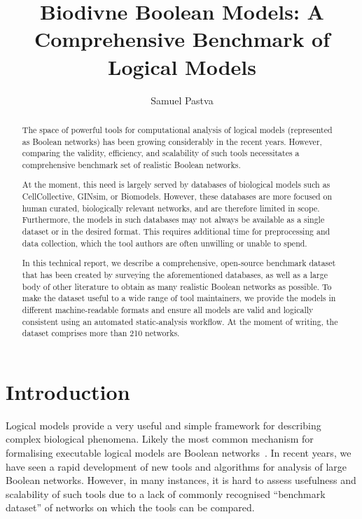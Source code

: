 \documentclass{article}
\title{Biodivne Boolean Models: A Comprehensive Benchmark of Logical Models}
\author{Samuel Pastva}
\date{}
\begin{document}
\maketitle

\begin{abstract}
	The space of powerful tools for computational analysis of logical models (represented as Boolean networks) has been growing considerably in the recent years. However, comparing the validity, efficiency, and scalability of such tools necessitates a comprehensive benchmark set of realistic Boolean networks.
	
	At the moment, this need is largely served by databases of biological models such as CellCollective, GINsim, or Biomodels. However, these databases are more focused on human curated, biologically relevant networks, and are therefore limited in scope. Furthermore, the models in such databases may not always be available as a single dataset or in the desired format. This requires additional time for preprocessing and data collection, which the tool authors are often unwilling or unable to spend.
	
	In this technical report, we describe a comprehensive, open-source benchmark dataset that has been created by surveying the aforementioned databases, as well as a large body of other literature to obtain as many realistic Boolean networks as possible. To make the dataset useful to a wide range of tool maintainers, we provide the models in different machine-readable formats and ensure all models are valid and logically consistent using an automated static-analysis workflow. At the moment of writing, the dataset comprises more than 210 networks.
\end{abstract}

\section{Introduction}

Logical models provide a very useful and simple framework for describing complex biological phenomena. Likely the most common mechanism for formalising executable logical models are Boolean networks~\cite{bn-intro}. In recent years, we have seen a rapid development of new tools and algorithms for analysis of large Boolean networks. However, in many instances, it is hard to assess usefulness and scalability of such tools due to a lack of commonly recognised ``benchmark dataset'' of networks on which the tools can be compared.
\end{document}
